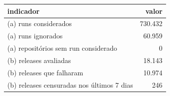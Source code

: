 \begin{tabular}{lr}
\hline
indicador & valor \\
\hline
(a) runs considerados & 730.432 \\
(a) runs ignorados & 60.959 \\
(a) repositórios sem run considerado & 0 \\
(b) releases avaliadas & 18.143 \\
(b) releases que falharam & 10.974 \\
(b) releases censuradas nos últimos 7 dias & 246 \\
\hline
\end{tabular}
